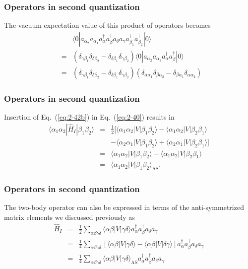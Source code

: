 \documentclass[compress]{beamer}
\newcommand*{\ket}[1]{|#1\rangle}
\newcommand*{\bra}[1]{\langle#1|}
\newcommand{\element}[3]
        {\bra{#1}#2\ket{#3}}
\begin{document}
\frame
{
  \frametitle{Operators in second quantization}
\begin{small}
{\scriptsize
The vacuum expectation value of this product of operators becomes
\begin{eqnarray}
	&& \element{0}{a_{\alpha_2} a_{\alpha_1} a^\dagger_\alpha a^\dagger_\beta a_\delta a_\gamma 
		a_{\beta_1}^\dagger a_{\beta_2}^\dagger}{0} \nonumber \\
	&=& (\delta_{\gamma \beta_1} \delta_{\delta \beta_2} -
		\delta_{\delta \beta_1} \delta_{\gamma \beta_2} ) 
		\element{0}{a_{\alpha_2} a_{\alpha_1}a^\dagger_\alpha a^\dagger_\beta}{0} \nonumber \\
	&=& (\delta_{\gamma \beta_1} \delta_{\delta \beta_2} -\delta_{\delta \beta_1} \delta_{\gamma \beta_2} )
	(\delta_{\alpha \alpha_1} \delta_{\beta \alpha_2} -\delta_{\beta \alpha_1} \delta_{\alpha \alpha_2} ) \label{eq:2-42b}
\end{eqnarray}
}
\end{small}
}

\frame
{
  \frametitle{Operators in second quantization}
\begin{small}
{\scriptsize
Insertion of 
Eq.~(\ref{eq:2-42b}) in Eq.~(\ref{eq:2-40}) results in
\begin{eqnarray}
	\element{\alpha_1\alpha_2}{\hat{H}_I}{\beta_1\beta_2} &=& \frac{1}{2} \big[ 
		\element{\alpha_1\alpha_2}{V}{\beta_1\beta_2} - \element{\alpha_1\alpha_2}{V}{\beta_2\beta_1} \nonumber \\
		&& - \element{\alpha_2\alpha_1}{V}{\beta_1\beta_2} + \element{\alpha_2\alpha_1}{V}{\beta_2\beta_1} \big] \nonumber \\
	&=& \element{\alpha_1\alpha_2}{V}{\beta_1\beta_2} - \element{\alpha_1\alpha_2}{V}{\beta_2\beta_1} \nonumber \\
	&=& \element{\alpha_1\alpha_2}{V}{\beta_1\beta_2}_{\mathrm{\mathrm{\mathrm{AS}}}}. \label{eq:2-43b}
\end{eqnarray}
}
\end{small}
}


\frame
{
  \frametitle{Operators in second quantization}
\begin{small}
{\scriptsize
The two-body operator can also be expressed in terms of the anti-symmetrized matrix elements we discussed previously as
\begin{eqnarray}
	\hat{H}_I &=& \frac{1}{2} \sum_{\alpha\beta\gamma\delta}  \element{\alpha \beta}{V}{\gamma \delta}
		a_\alpha^\dagger a_\beta^\dagger a_\delta a_\gamma \nonumber \\
	&=& \frac{1}{4} \sum_{\alpha\beta\gamma\delta} \left[ \element{\alpha \beta}{V}{\gamma \delta} -
		\element{\alpha \beta}{V}{\delta\gamma } \right] 
		a_\alpha^\dagger a_\beta^\dagger a_\delta a_\gamma \nonumber \\
	&=& \frac{1}{4} \sum_{\alpha\beta\gamma\delta} \element{\alpha \beta}{V}{\gamma \delta}_{\mathrm{\mathrm{AS}}}
		a_\alpha^\dagger a_\beta^\dagger a_\delta a_\gamma \label{eq:2-45}
\end{eqnarray}
}
\end{small}
}
\end{document}
